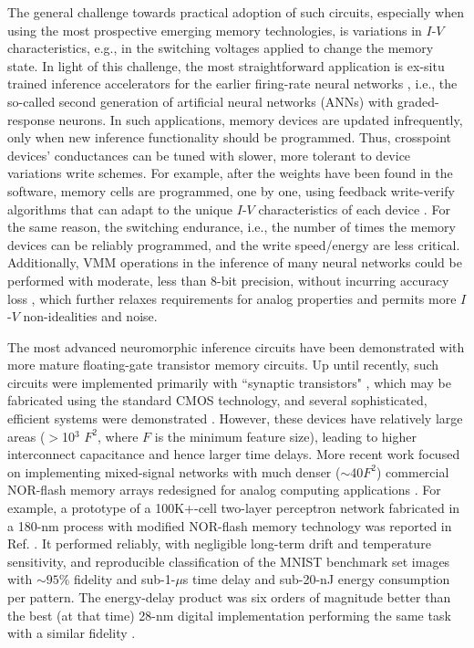 The general challenge towards practical adoption of such circuits, especially when using the most prospective emerging memory technologies, is variations in $I$-$V$ characteristics, e.g., in the switching voltages applied to change the memory state.  In light of this challenge, the most straightforward application is ex-situ trained inference accelerators for the earlier firing-rate neural networks \cite{Bavandpour2018}, i.e., the so-called second generation of artificial neural networks (ANNs) with graded-response neurons. In such applications, memory devices are updated infrequently, only when new inference functionality should be programmed. Thus, crosspoint devices' conductances can be tuned with slower, more tolerant to device variations write schemes. For example, after the weights have been found in the software, memory cells are programmed, one by one, using feedback write-verify algorithms that can adapt to the unique $I$-$V$ characteristics of each device \cite{Alibart2012}.  For the same reason, the switching endurance, i.e., the number of times the memory devices can be reliably programmed, and the write speed/energy are less critical.  Additionally, VMM operations in the inference of many neural networks could be performed with moderate, less than 8-bit precision, without incurring accuracy loss \cite{Yang2019IEDM}, which further relaxes requirements for analog properties and permits more $I$-$V$ non-idealities and noise.

The most advanced neuromorphic inference circuits have been demonstrated with more mature floating-gate transistor memory circuits. Up until recently, such circuits were implemented primarily with ``synaptic transistors" \cite{Diorio1996}, which may be fabricated using the standard CMOS technology, and several sophisticated, efficient systems were demonstrated \cite{Hasler2013, Chawla2004, George2016}.  However, these devices have relatively large areas ($>$10$^3$ $F^2$, where $F$ is the minimum feature size), leading to higher interconnect capacitance and hence larger time delays. More recent work focused on implementing mixed-signal networks with much denser ($\sim$40$F^2$) commercial NOR-flash memory arrays redesigned for analog computing applications \cite{MerrikhBayat2015, Guo2017CICC}. For example, a prototype of a 100K+-cell two-layer perceptron network fabricated in a 180-nm process with modified NOR-flash memory technology was reported in Ref. \cite{Guo2017IEDM}. It performed reliably, with negligible long-term drift and temperature sensitivity, and reproducible classification of the MNIST benchmark set images with $\sim95\%$ fidelity and sub-1-$\mu$s time delay and sub-20-nJ energy consumption per pattern. The energy-delay product was six orders of magnitude better than the best (at that time) 28-nm digital implementation performing the same task with a similar fidelity \cite{Guo2017IEDM}. 

